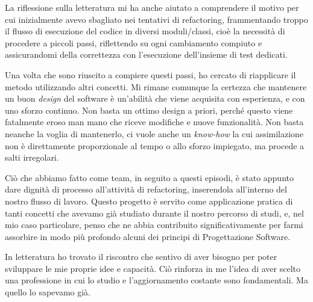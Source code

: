 \documentclass[12pt]{report}
\begin{document}
La riflessione sulla letteratura mi ha anche aiutato a comprendere il 
motivo per cui inizialmente avevo sbagliato nei tentativi di refactoring,
frammentando troppo il flusso di esecuzione del codice 
in diversi moduli/classi, cioè la necessità
di procedere a piccoli passi, riflettendo su ogni
cambiamento compiuto e assicurandomi della correttezza con
l'esecuzione dell'insieme di test dedicati. 

Una volta che sono riuscito a compiere questi passi, ho cercato di riapplicare
il metodo utilizzando altri concetti. Mi rimane comunque la certezza che
mantenere un buon \textit{design} del software è un'abilità che viene acquisita
con esperienza, e con uno sforzo continuo. Non basta un ottimo design a
priori, perché questo viene fatalmente eroso man mano che riceve modifiche
e nuove funzionalità. Non basta neanche la voglia di mantenerlo, ci vuole
anche un \textit{know-how} la cui assimilazione non è direttamente 
proporzionale al tempo o allo sforzo impiegato, ma procede a salti irregolari.

Ciò che abbiamo fatto come team, in seguito a questi episodi, è stato appunto
dare dignità di processo all'attività di refactoring, inserendola all'interno
del nostro flusso di lavoro. Questo progetto è servito come applicazione 
pratica di tanti concetti che avevamo già studiato durante il nostro percorso
di studi, e, nel mio caso particolare, penso che ne abbia contribuito 
significativamente per farmi assorbire in modo più profondo alcuni dei
principi di Progettazione Software.





In letteratura ho trovato il riscontro che sentivo di aver bisogno per
poter sviluppare le mie proprie idee e capacità. Ciò rinforza in me l'idea
di aver scelto una professione in cui lo studio e l'aggiornamento costante 
sono fondamentali. Ma quello lo sapevamo già.
%
\end{document}
